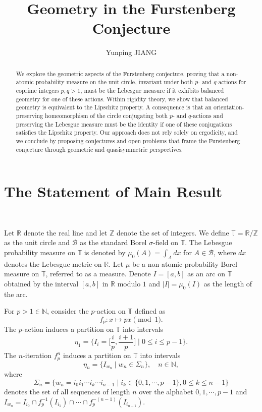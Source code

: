 \documentclass[11pt]{amsart}
\title[Geometry in the Furstenberg Conjecture]{Geometry in the Furstenberg Conjecture}
\author{Yunping JIANG}
\theoremstyle{definition}
\def\N{\mathbb{N}}
\def\Si{\Sigma}
\begin{document}
\begin{abstract}
We explore the geometric aspects of the Furstenberg conjecture, proving that a non-atomic probability measure on the unit circle, invariant under both $p$- and $q$-actions for coprime integers $p,q>1$, must be the Lebesgue measure if it exhibits balanced geometry for one of these actions. Within rigidity theory, we show that balanced geometry is equivalent to the Lipschitz property. A consequence is that an orientation-preserving homeomorphism of the circle conjugating both $p$- and $q$-actions and preserving the Lebesgue measure must be the identity if one of these conjugations satisfies the Lipschitz property.
Our approach does not rely solely on ergodicity, and we conclude by proposing conjectures and open problems that frame the Furstenberg conjecture through geometric and quasisymmetric perspectives.
\end{abstract}

\maketitle




\section{The Statement of Main Result}~\label{bgsect}

Let $\mathbb{R}$ denote the real line and let $\mathbb{Z}$ denote the set of integers. We define $\mathbb{T}=\mathbb{R}/\mathbb{Z}$ as the unit circle and $\mathcal{B}$ as the standard Borel $\sigma$-field on $\mathbb{T}$. The Lebesgue probability measure on $\mathbb{T}$ is denoted by $\mu_{0}(A) =\int_{A} dx$ for $A\in \mathcal{B}$, where $dx$ denotes the Lebesgue metric on $\mathbb{R}$. Let $\mu$ be a non-atomic probability Borel measure on $\mathbb{T}$, referred to as a measure. 
Denote $I=[a,b]$ as an arc on $\mathbb{T}$ obtained by the interval $[a,b]$ in $\mathbb{R}$ modulo $1$ and $|I|=\mu_{0}(I)$ as the length of the arc. 

For $p>1\in \mathbb{N}$, consider the $p$-action on $\mathbb{T}$ defined as
$$
f_{p}: x\mapsto px \pmod{1}.
$$ 
The $p$-action induces a partition on $\mathbb{T}$ into intervals
 $$
\eta_{1}=\Big\{ I_{i}=\Big[\frac{i}{p}, \frac{i+1}{p}\Big]\;\Big|\; 0\leq i\leq p-1\Big\}.
 $$
The $n$-iteration $f^{n}_{p}$ induces a partition on $\mathbb{T}$ into intervals
$$
\eta_{n} =\{ I_{w_{n}}\;|\; w_{n}\in \Si_{n}\}, \quad n\in \N,
$$
where 
$$
\Si_{n}= \{w_{n}=i_{0}i_{1}\cdots i_{k}\cdots i_{n-1}\;|\; i_{k}\in \{0, 1, \cdots, p-1\}, 0\leq k\leq n-1\}
$$ 
denotes the set of all sequences of length $n$ over the alphabet ${0, 1, \cdots, p-1}$ and 
$
I_{w_{n}} =I_{i_{0}}\cap f^{-1}_{p} (I_{i_{1}})\cap \cdots \cap f^{-(n-1)}_{p} (I_{i_{n-1}}).
$
\end{document}
